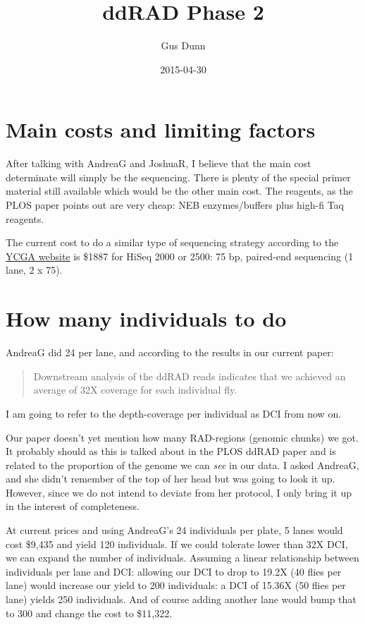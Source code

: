 \documentclass[letterpaper]{scrartcl}
\title{ddRAD Phase 2}
\author{Gus Dunn}
\date{2015-04-30}
\begin{document}
\maketitle

\section{Main costs and limiting
factors}\label{main-costs-and-limiting-factors}

After talking with AndreaG and JoshuaR, I believe that the main cost
determinate will simply be the sequencing. There is plenty of the
special primer material still available which would be the other main
cost. The reagents, as the PLOS paper points out are very cheap: NEB
enzymes/buffers plus high-fi Taq reagents.

The current cost to do a similar type of sequencing strategy according
to the
\href{http://medicine.yale.edu/keck/ycga/services/illuminaprices.aspx}{YCGA
website} is \$1887 for HiSeq 2000 or 2500: 75 bp, paired-end sequencing
(1 lane, 2 x 75).

\section{How many individuals to do}\label{how-many-individuals-to-do}

AndreaG did 24 per lane, and according to the results in our current
paper:

\begin{quote}
Downstream analysis of the ddRAD reads indicates that we achieved an
average of 32X coverage for each individual fly.
\end{quote}

I am going to refer to the depth-coverage per individual as DCI from now
on.

Our paper doesn't yet mention how many RAD-regions (genomic chunks) we
got. It probably should as this is talked about in the PLOS ddRAD paper
and is related to the proportion of the genome we can \emph{see} in our
data. I asked AndreaG, and she didn't remember of the top of her head
but was going to look it up. However, since we do not intend to deviate
from her protocol, I only bring it up in the interest of completeness.

At current prices and using AndreaG's 24 individuals per plate, 5 lanes
would cost \$9,435 and yield 120 individuals. If we could tolerate lower
than 32X DCI, we can expand the number of individuals. Assuming a linear
relationship between individuals per lane and DCI: allowing our DCI to
drop to 19.2X (40 flies per lane) would increase our yield to 200
individuals: a DCI of 15.36X (50 flies per lane) yields 250 individuals.
And of course adding another lane would bump that to 300 and change the
cost to \$11,322.
\end{document}

